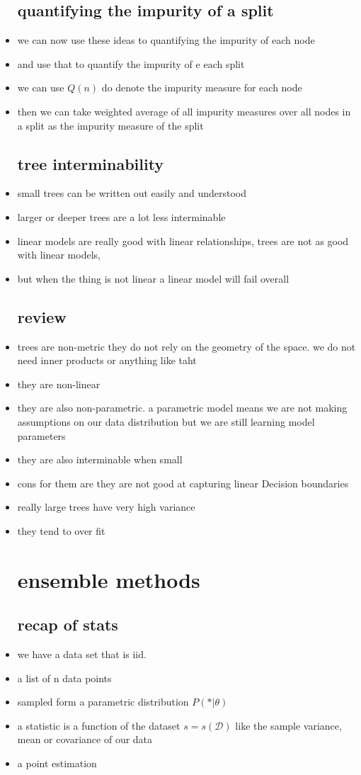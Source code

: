 \documentclass{article}
\begin{document}
\begin{itemize}
\subsection*{quantifying the impurity of a split }
\item we can now use these ideas to quantifying the impurity of each node 
\item and use that to quantify the impurity of e each split
\item we can use $Q(n)$ do denote the impurity measure for each node 
\item then we can take  weighted average of all impurity measures over all nodes in a split as the impurity measure of the split 
\subsection*{tree interminability}
\item small trees can be written out easily and understood 
\item larger or deeper trees are a lot less interminable
\item linear models are really good with linear relationships, trees are not as good with 
linear models, 
\item but when the thing is not linear a linear model will fail overall
\subsection*{review}
\item trees are non-metric they do not rely on the geometry of the space. we do not need inner products or anything like taht 
\item they are non-linear 
\item they are also non-parametric. a parametric model means we are not making assumptions on our data distribution but we are still learning model parameters 
\item they are also interminable when small 
\item cons for them are they are not good at capturing linear Decision boundaries 
\item really large trees have very high variance
\item they tend to over fit 
\section*{ensemble methods}
\subsection*{recap of stats }
\item we have a data set that is iid.
\item  a list of n data points 
\item sampled form a parametric distribution $P(*|\theta)$
\item a statistic is a function of the dataset $s=s(\mathcal{D})$ like the sample variance, mean or covariance of our data 
\item a point estimation 

\end{itemize}
\end{document}
